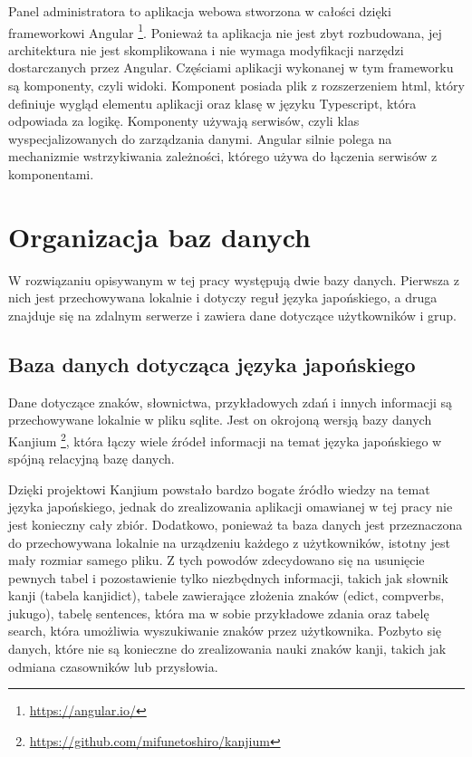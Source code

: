 \documentclass[a4paper,twoside,12pt]{book}
\begin{document}
Panel administratora to aplikacja webowa stworzona w całości dzięki frameworkowi Angular \footnote{\url{https://angular.io/}}. Ponieważ ta aplikacja nie jest zbyt rozbudowana, jej architektura nie jest skomplikowana i nie wymaga modyfikacji narzędzi dostarczanych przez Angular. Częściami aplikacji wykonanej w tym frameworku są komponenty, czyli widoki. Komponent posiada plik z rozszerzeniem html, który definiuje wygląd elementu aplikacji oraz klasę w języku Typescript, która odpowiada za logikę. Komponenty używają serwisów, czyli klas wyspecjalizowanych do zarządzania danymi. Angular silnie polega na mechanizmie wstrzykiwania zależności, którego używa do łączenia serwisów z komponentami. 

\section{Organizacja baz danych}

W rozwiązaniu opisywanym w tej pracy występują dwie bazy danych. Pierwsza z nich jest przechowywana lokalnie i dotyczy reguł języka japońskiego, a druga znajduje się na zdalnym serwerze i zawiera dane dotyczące użytkowników i grup.

\subsection{Baza danych dotycząca języka japońskiego}

Dane dotyczące znaków, słownictwa, przykładowych zdań i innych informacji są przechowywane lokalnie w pliku sqlite. Jest on okrojoną wersją bazy danych Kanjium \footnote{\url{https://github.com/mifunetoshiro/kanjium}}, która łączy wiele źródeł informacji na temat języka japońskiego w spójną relacyjną bazę danych. 

Dzięki projektowi Kanjium powstało bardzo bogate źródło wiedzy na temat języka japońskiego, jednak do zrealizowania aplikacji omawianej w tej pracy nie jest konieczny cały zbiór. Dodatkowo, ponieważ ta baza danych jest przeznaczona do przechowywana lokalnie na urządzeniu każdego z użytkowników, istotny jest mały rozmiar samego pliku. Z tych powodów zdecydowano się na usunięcie pewnych tabel i pozostawienie tylko niezbędnych informacji, takich jak słownik kanji (tabela kanjidict), tabele zawierające złożenia znaków (edict, compverbs, jukugo), tabelę sentences, która ma w sobie przykładowe zdania oraz tabelę search, która umożliwia wyszukiwanie znaków przez użytkownika. Pozbyto się danych, które nie są konieczne do zrealizowania nauki znaków kanji, takich jak odmiana czasowników lub przysłowia.
\end{document}
